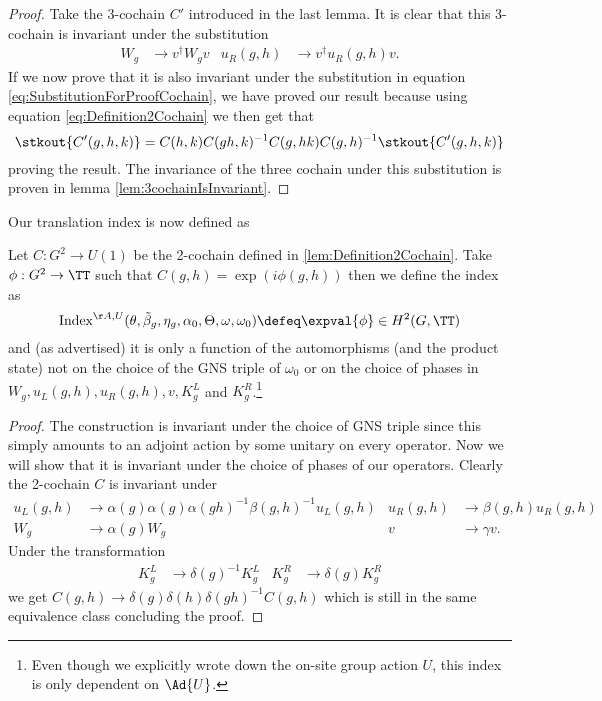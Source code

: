 \begin{proof}
	Take the 3-cochain $C'$ introduced in the last lemma. It is clear that this 3-cochain is invariant under the substitution
	\begin{align}
		W_g&\rightarrow v^\dagger W_g v&u_R(g,h)&\rightarrow v^\dagger u_R(g,h)v.
	\end{align}
	If we now prove that it is also invariant under the substitution in equation \ref{eq:SubstitutionForProofCochain}, we have proved our result because using equation \eqref{eq:Definition2Cochain} we then get that
	\begin{equation}
		\stkout{C'(g,h,k)}=C(h,k)C(gh,k)^{-1}C(g,hk)C(g,h)^{-1}\stkout{C'(g,h,k)}
	\end{equation}
	proving the result. The invariance of the three cochain under this substitution is proven in lemma \ref{lem:3cochainIsInvariant}.
\end{proof}
Our translation index is now defined as
\begin{definition}\label{def:DefinitionOfTheH2ValuedIndex}
	Let $C:G^2\rightarrow U(1)$ be the 2-cochain defined in \ref{lem:Definition2Cochain}. Take $\phi:G^2\rightarrow\TT$ such that $C(g,h)=\exp(i\phi(g,h))$ then we define the index as
	\begin{equation}
		\textrm{Index}^{\AA,U}(\theta,\tilde{\beta}_g,\eta_g,\alpha_0,\Theta,\omega,\omega_0)\defeq\expval{\phi}\in H^2(G,\TT)
	\end{equation}
	and (as advertised) it is only a function of the automorphisms (and the product state) not on the choice of the GNS triple of $\omega_0$ or on the choice of phases in $W_g,u_L(g,h),u_R(g,h),v,K_g^L$ and $K_g^R$.\footnote{Even though we explicitly wrote down the on-site group action $U$, this index is only dependent on $\Ad{U}$.}
\end{definition}
\begin{proof}
	The construction is invariant under the choice of GNS triple since this simply amounts to an adjoint action by some unitary on every operator. Now we will show that it is invariant under the choice of phases of our operators. Clearly the 2-cochain $C$ is invariant under
	\begin{align}
		u_L(g,h)&\rightarrow \alpha(g)\alpha(g)\alpha(gh)^{-1}\beta(g,h)^{-1} u_L(g,h)&u_R(g,h)&\rightarrow \beta(g,h)u_R(g,h)\\
		\nonumber
		W_g&\rightarrow\alpha(g)W_g&v&\rightarrow \gamma v.
	\end{align}
	Under the transformation
	\begin{align}
		K_g^L&\rightarrow \delta(g)^{-1}K_g^L&K_g^R&\rightarrow \delta(g)K_g^R
	\end{align}
	we get $C(g,h)\rightarrow \delta(g)\delta(h)\delta(gh)^{-1}C(g,h)$ which is still in the same equivalence class concluding the proof.
\end{proof}

